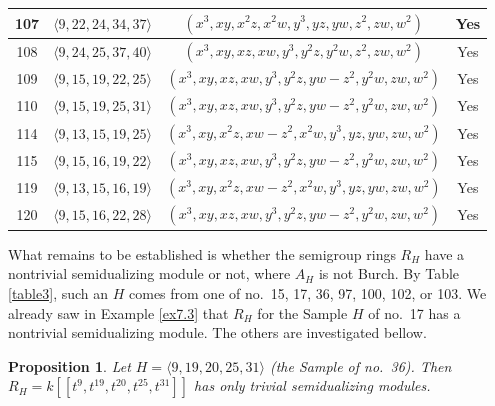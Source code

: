 \documentclass{amsart}
\theoremstyle{plain}
\newtheorem{prop}[theorem]{Proposition}
\theoremstyle{definition}
\numberwithin{theorem}{section}
\numberwithin{equation}{section}
\numberwithin{equation}{theorem}
\begin{document}
\begin{longtable}{|c|c|c|c|}
\hline
107 &  $\langle 9,22,24,34,37\rangle$ & $(x^3,xy,x^2z,x^2w,y^3,yz,yw,z^2,zw,w^2)$ & Yes\\

\hline
108 &  $\langle 9,24,25,37,40\rangle$ & $(x^3,xy,xz,xw,y^3,y^2z,y^2w,z^2,zw,w^2)$ & Yes\\

\hline
109 &  $\langle 9,15,19,22,25\rangle$ & $(x^3,xy,xz,xw,y^3,y^2z,yw-z^2,y^2w,zw,w^2)$ & Yes\\

\hline
110 &  $\langle 9,15,19,25,31\rangle$ & $(x^3,xy,xz,xw,y^3,y^2z,yw-z^2,y^2w,zw,w^2)$ & Yes\\

\hline
114 & $\langle 9,13,15,19,25\rangle$ & $(x^3,xy,x^2z,xw-z^2,x^2w,y^3,yz,yw,zw,w^2)$ & Yes\\

\hline
115 & $\langle 9,15,16,19,22\rangle$ & $(x^3,xy,xz,xw,y^3,y^2z,yw-z^2,y^2w,zw,w^2)$ & Yes\\

\hline
119 & $\langle 9,13,15,16,19 \rangle$ & $(x^3,xy,x^2z,xw-z^2,x^2w,y^3,yz,yw,zw,w^2)$ & Yes\\

\hline
120 & $\langle 9,15,16,22,28 \rangle$ & $(x^3,xy,xz,xw,y^3,y^2z,yw-z^2,y^2w,zw,w^2)$ & Yes\\

\hline
\end{longtable}

What remains to be established is whether the semigroup rings $R_H$ have a nontrivial semidualizing module or not, where $A_H$ is not Burch.
By Table \ref{table3}, such an $H$ comes from one of no.\ 15, 17, 36, 97, 100, 102, or 103.
We already saw in Example \ref{ex7.3} that $R_H$ for the Sample $H$ of no.\ 17 has a nontrivial semidualizing module.
The others are investigated bellow.

\begin{prop}\label{sample36}
Let $H=\langle9,19,20,25,31\rangle$ (the Sample of no.\ 36).
Then $R_H=k[\![t^9,t^{19},t^{20},t^{25},t^{31}]\!]$ has only trivial semidualizing modules.
\end{prop}
\end{document}
